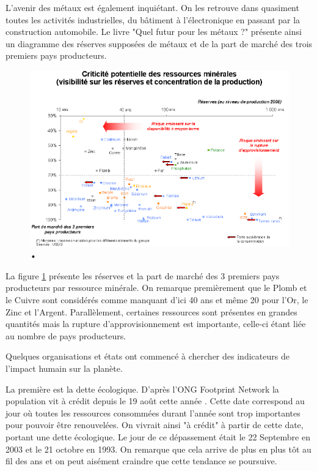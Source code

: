 L'avenir des métaux est également inquiétant. On les retrouve dans quasiment toutes les activités industrielles, du bâtiment à l’électronique en passant par la construction automobile. Le livre "Quel futur pour les métaux ?" \cite{LivreFuturMetaux} présente ainsi un diagramme des réserves supposées de métaux et de la part de marché des trois premiers pays producteurs.

\begin{figure}[h]
\includegraphics[scale=0.75]{Rsc/risquemetaux.png}
\caption{•}
\label{CriticiteMetaux}%
\end{figure}

\medbreak La figure \ref{CriticiteMetaux} présente les réserves et la part de marché des 3 premiers pays producteurs par ressource minérale. On remarque premièrement que le Plomb et le Cuivre sont considérés comme manquant d'ici 40 ans et même 20 pour l'Or, le Zinc et l'Argent. Parallèlement, certaines ressources sont présentes en grandes quantités mais la rupture d'approvisionnement est importante, celle-ci étant liée au nombre de pays producteurs.

\medbreak Quelques organisations et états ont commencé à chercher des indicateurs de l'impact humain sur la planète.

La première est la dette écologique. D'après l'ONG Footprint Network la population vit à crédit depuis le 19 août cette année \cite{DateACredit}. Cette date correspond au jour où toutes les ressources consommées durant l'année sont trop importantes pour pouvoir être renouvelées. On vivrait ainsi "à crédit" à partir de cette date, portant une dette écologique. Le jour de ce dépassement était le 22 Septembre en 2003 et le 21 octobre en 1993. On remarque que cela arrive de plus en plus tôt au fil des ans et on peut aisément craindre que cette tendance se poursuive.

